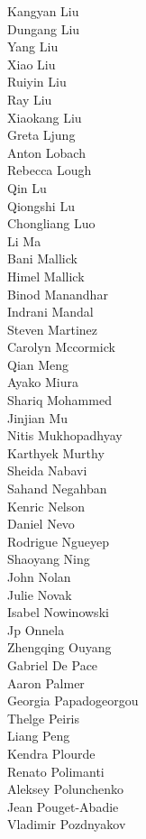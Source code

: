 Kangyan Liu\\
Dungang Liu\\
Yang Liu\\
Xiao Liu\\
Ruiyin Liu\\
Ray Liu\\
Xiaokang  Liu\\
Greta Ljung\\
Anton Lobach\\
Rebecca Lough\\
Qin Lu\\
Qiongshi Lu\\
Chongliang Luo\\
Li Ma\\
Bani Mallick\\
Himel Mallick\\
Binod Manandhar\\
Indrani Mandal\\
Steven  Martinez\\
Carolyn Mccormick\\
Qian Meng\\
Ayako Miura\\
Shariq Mohammed\\
Jinjian Mu\\
Nitis Mukhopadhyay\\
Karthyek Murthy\\
Sheida Nabavi\\
Sahand Negahban\\
Kenric Nelson\\
Daniel Nevo\\
Rodrigue Ngueyep\\
Shaoyang Ning\\
John Nolan\\
Julie Novak\\
Isabel Nowinowski\\
Jp Onnela\\
Zhengqing Ouyang\\
Gabriel De Pace\\
Aaron Palmer\\
Georgia Papadogeorgou\\
Thelge Peiris\\
Liang Peng\\
Kendra Plourde\\
Renato Polimanti\\
Aleksey Polunchenko\\
Jean Pouget-Abadie\\
Vladimir Pozdnyakov\\
